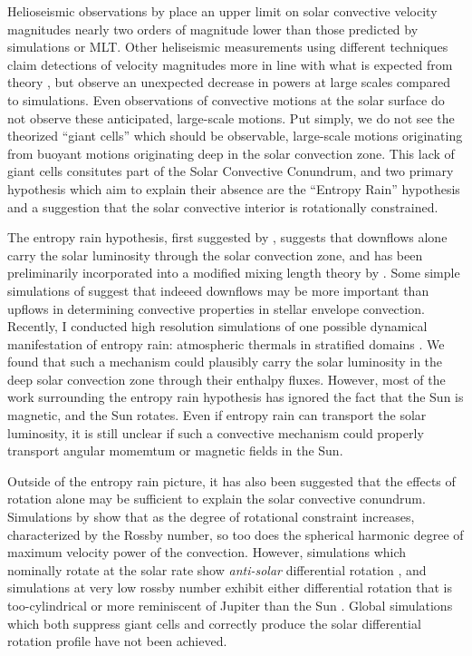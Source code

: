 \documentclass[aasms,12pt]{article}
\begin{document}
Helioseismic observations by \citet{hanasoge&all2012} place an upper limit on solar convective velocity magnitudes nearly two orders of magnitude lower than those predicted by simulations or MLT.
Other heliseismic measurements using different techniques claim detections of velocity magnitudes more in line with what is expected from theory \citep{greer&all2015}, but observe an unexpected decrease in powers at large scales compared to simulations.
Even observations of convective motions at the solar surface \citep{hathaway&all2015} do not observe these anticipated, large-scale motions.
Put simply, we do not see the theorized ``giant cells'' which should be observable, large-scale motions originating from buoyant motions originating deep in the solar convection zone.
This lack of giant cells consitutes part of the Solar Convective Conundrum, and two primary hypothesis which aim to explain their absence are the ``Entropy Rain'' hypothesis and a suggestion that the solar convective interior is rotationally constrained.

The entropy rain hypothesis, first suggested by \citet{spruit1997}, suggests that downflows alone carry the solar luminosity through the solar convection zone, and has been preliminarily incorporated into a modified mixing length theory by \citet{brandenburg2016}.
Some simple simulations of \citet{kapyla&all2017} suggest that indeeed downflows may be more important than upflows in determining convective properties in stellar envelope convection.
Recently, I conducted high resolution simulations of one possible dynamical manifestation of entropy rain: atmospheric thermals in stratified domains \citep{andersLB2019}.
We found that such a mechanism could plausibly carry the solar luminosity in the deep solar convection zone through their enthalpy fluxes.
However, most of the work surrounding the entropy rain hypothesis has ignored the fact that the Sun is magnetic, and the Sun rotates.
Even if entropy rain can transport the solar luminosity, it is still unclear if such a convective mechanism could properly transport angular momemtum or magnetic fields in the Sun.

Outside of the entropy rain picture, it has also been suggested that the effects of rotation alone may be sufficient to explain the solar convective conundrum.
Simulations by \citet{featherstone&hindman2016} show that as the degree of rotational constraint increases, characterized by the Rossby number, so too does the spherical harmonic degree of maximum velocity power of the convection.
However, simulations which nominally rotate at the solar rate show \emph{anti-solar} differential rotation \citep{gastine&all2014}, and simulations at very low rossby number exhibit either differential rotation that is too-cylindrical or more reminiscent of Jupiter than the Sun \citep{brun&all2017}.
Global simulations which both suppress giant cells and correctly produce the solar differential rotation profile have not been achieved.
\end{document}
